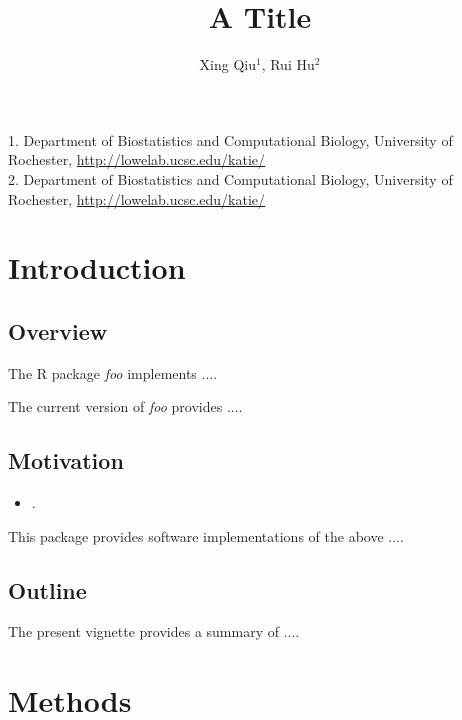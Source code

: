 \documentclass[11pt]{article}
\newcommand{\Rpackage}[1]{\textit{#1}}
\begin{document}
\title{A Title} 
\author{Xing Qiu$^1$, Rui Hu$^2$} 
\maketitle

\begin{center}
  1. Department of Biostatistics and Computational Biology, University of Rochester, \url{ http://lowelab.ucsc.edu/katie/}\\
  2. Department of Biostatistics and Computational Biology, University of Rochester, \url{ http://lowelab.ucsc.edu/katie/}\\
\end{center}

\tableofcontents

\label{anal:mult:multtest}

\section{Introduction}
\label{anal:mult:s:intro}

\subsection{Overview}
The R package \Rpackage{foo} implements  .... 

The current version of \Rpackage{foo} provides ....

\subsection{Motivation}

\begin{itemize}
\item .
\end{itemize}

This package provides software implementations of the above ....

\subsection{Outline}

The present vignette provides a summary of ....

\section{Methods}
\label{anal:mult:s:methods}
\end{document}
